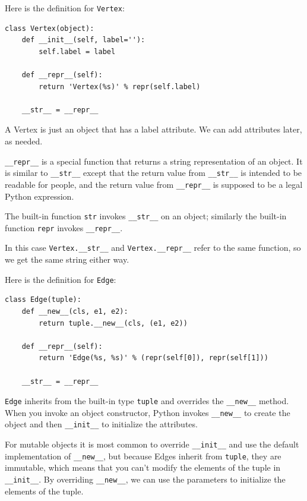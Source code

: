 \documentclass[10pt]{book}
\begin{document}
Here is the definition for {\tt Vertex}:
%
\begin{verbatim}
class Vertex(object):
    def __init__(self, label=''):
        self.label = label

    def __repr__(self):
        return 'Vertex(%s)' % repr(self.label)

    __str__ = __repr__
\end{verbatim}
%
A Vertex is just an object that has a label attribute.  We can
add attributes later, as needed.

\verb"__repr__" is a special function that returns a string
representation of an object.  It is similar to \verb"__str__" except
that the return value from \verb"__str__" is intended to be readable
for people, and the return value from \verb"__repr__" is supposed to
be a legal Python expression.

The built-in function {\tt str} invokes \verb"__str__" on
an object; similarly the built-in function {\tt repr} invokes
\verb"__repr__".

In this case \verb"Vertex.__str__" and \verb"Vertex.__repr__" refer to
the same function, so we get the same string either way.

Here is the definition for {\tt Edge}:
%
\begin{verbatim}
class Edge(tuple):
    def __new__(cls, e1, e2):
        return tuple.__new__(cls, (e1, e2))

    def __repr__(self):
        return 'Edge(%s, %s)' % (repr(self[0]), repr(self[1]))

    __str__ = __repr__
\end{verbatim}
%
{\tt Edge} inherits from the built-in type {\tt tuple}
and overrides the \verb"__new__" method.  When you invoke
an object constructor, Python invokes \verb"__new__" to create
the object and then \verb"__init__" to initialize the attributes.

For mutable objects it is most common to override
\verb"__init__" and use the default implementation of
\verb"__new__", but because Edges inherit from {\tt tuple}, they
are immutable, which means that you can't modify the elements
of the tuple in \verb"__init__".
By overriding \verb"__new__", we can use the parameters to initialize
the elements of the tuple.
\end{document}
